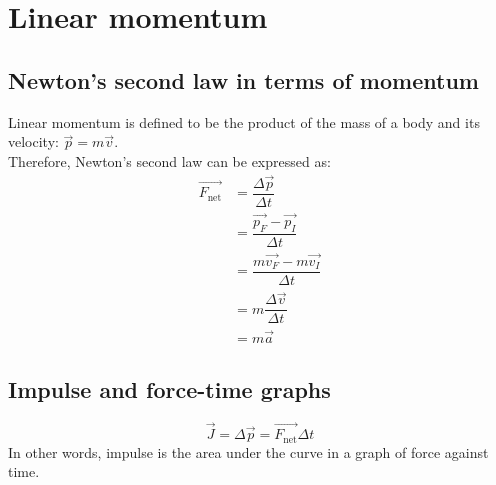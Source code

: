 \documentclass[a4paper,12pt]{article}
\begin{document}
\section{Linear momentum}
\subsection{Newton's second law in terms of momentum}
Linear momentum is defined to be the product of the mass of a body and its velocity: \(\vec{p}=m\vec{v}\).\\
Therefore, Newton's second law can be expressed as:
$$\begin{aligned}\vec{F_\text{net}}&=\dfrac{\Delta \vec{p}}{\Delta t}\\&=\dfrac{\vec{p_F}-\vec{p_I}}{\Delta t}\\&=\dfrac{m\vec{v_F}-m\vec{v_I}}{\Delta t}\\&=m\dfrac{\Delta \vec{v}}{\Delta t}\\&=m\vec{a}\end{aligned}$$
\subsection{Impulse and force-time graphs}
\[\vec{J}=\Delta \vec{p}=\vec{F_\text{net}}\Delta t\]
In other words, impulse is the area under the curve in a graph of force against time.
\end{document}
